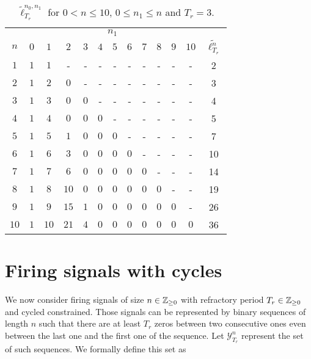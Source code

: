 \documentclass{article}
\begin{document}
    \begin{table}[!ht]
      \centering
      \begin{tabular}{*{13}{c}}
        \toprule
        & \multicolumn{11}{c}{$n_1$} & \\
        $n$ & $0$ & $1$ & $2$ & $3$ & $4$ & $5$ & $6$ & $7$ & $8$ & $9$ & $10$ & $\tilde{\ell^n_{T_r}}$\\
        \midrule
        $1$ & $1$ & $1$ & - & - & - & - & - & - & - & - & - & 2 \\
        $2$ & $1$ & $2$ & $0$ & - & - & - & - & - & - & - & - & 3 \\
        $3$ & $1$ & $3$ & $0$ & $0$ & - & - & - & - & - & - & - & 4 \\
        $4$ & $1$ & $4$ & $0$ & $0$ & $0$ & - & - & - & - & - & - & 5 \\
        $5$ & $1$ & $5$ & $1$ & $0$ & $0$ & $0$ & - & - & - & - & - & 7 \\
        $6$ & $1$ & $6$ & $3$ & $0$ & $0$ & $0$ & $0$ & - & - & - & - & 10\\
        $7$ & $1$ & $7$ & $6$ & $0$ & $0$ & $0$ & $0$ & $0$ & - & - & - & 14 \\
        $8$ & $1$ & $8$ & $10$ & $0$ & $0$ & $0$ & $0$ & $0$ & $0$ & - & - & 19 \\
        $9$ & $1$ & $9$ & $15$ & $1$ & $0$ & $0$ & $0$ & $0$ & $0$ & $0$ & - & 26 \\
        $10$ & $1$ & $10$ & $21$ & $4$ & $0$ & $0$ & $0$ & $0$ & $0$ & $0$ & $0$ & 36 \\
        \bottomrule
      \end{tabular}
      \caption{$\tilde{\ell}_{T_r}^{n_0,n_1}$ for $0 < n \leq 10$, $0 \leq n_1 \leq n$ and $T_r = 3$.}
      \label{tab:aperiodic_three_spike}
    \end{table}

    
    
    \clearpage
    \section{Firing signals with cycles}
    
    We now consider firing signals of size $n \in \mathbb{Z}_{\geq 0}$ with refractory period $T_r \in \mathbb{Z}_{\geq 0}$ and cycled constrained. 
    Those signals can be represented by binary sequences of length $n$ such that there are at least $T_r$ zeros between two consecutive ones
    even between the last one and the first one of the sequence. Let $\mathcal{Y}_{T_r}^n$
    represent the set of such sequences. We formally define this set as
\end{document}
